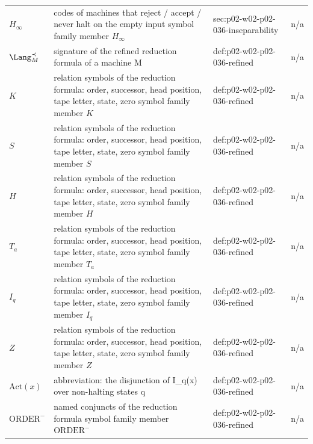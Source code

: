 \begin{longtable}{@{}p{}p{}p{}p{}@{}}
\(H_\infty\) & codes of machines that reject / accept / never halt on the empty input symbol family member \(H_\infty\) & sec:\allowbreak{}p02-\allowbreak{}w02-\allowbreak{}p02-\allowbreak{}036-\allowbreak{}inseparability & n/a \\
\(\Lang_M^{\prec}\) & signature of the refined reduction formula of a machine M & def:\allowbreak{}p02-\allowbreak{}w02-\allowbreak{}p02-\allowbreak{}036-\allowbreak{}refined & n/a \\
\(K\) & relation symbols of the reduction formula: order, successor, head position, tape letter, state, zero symbol family member \(K\) & def:\allowbreak{}p02-\allowbreak{}w02-\allowbreak{}p02-\allowbreak{}036-\allowbreak{}refined & n/a \\
\(S\) & relation symbols of the reduction formula: order, successor, head position, tape letter, state, zero symbol family member \(S\) & def:\allowbreak{}p02-\allowbreak{}w02-\allowbreak{}p02-\allowbreak{}036-\allowbreak{}refined & n/a \\
\(H\) & relation symbols of the reduction formula: order, successor, head position, tape letter, state, zero symbol family member \(H\) & def:\allowbreak{}p02-\allowbreak{}w02-\allowbreak{}p02-\allowbreak{}036-\allowbreak{}refined & n/a \\
\(T_a\) & relation symbols of the reduction formula: order, successor, head position, tape letter, state, zero symbol family member \(T_a\) & def:\allowbreak{}p02-\allowbreak{}w02-\allowbreak{}p02-\allowbreak{}036-\allowbreak{}refined & n/a \\
\(I_q\) & relation symbols of the reduction formula: order, successor, head position, tape letter, state, zero symbol family member \(I_q\) & def:\allowbreak{}p02-\allowbreak{}w02-\allowbreak{}p02-\allowbreak{}036-\allowbreak{}refined & n/a \\
\(Z\) & relation symbols of the reduction formula: order, successor, head position, tape letter, state, zero symbol family member \(Z\) & def:\allowbreak{}p02-\allowbreak{}w02-\allowbreak{}p02-\allowbreak{}036-\allowbreak{}refined & n/a \\
\(\mathrm{Act}(x)\) & abbreviation: the disjunction of I\_q(x) over non-halting states q & def:\allowbreak{}p02-\allowbreak{}w02-\allowbreak{}p02-\allowbreak{}036-\allowbreak{}refined & n/a \\
\(\mathrm{ORDER}^{-}\) & named conjuncts of the reduction formula symbol family member \(\mathrm{ORDER}^{-}\) & def:\allowbreak{}p02-\allowbreak{}w02-\allowbreak{}p02-\allowbreak{}036-\allowbreak{}refined & n/a \\

\end{longtable}
